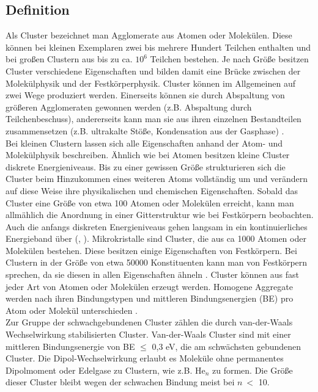 \subsection{Definition}

Als Cluster bezeichnet man Agglomerate aus Atomen oder Molekülen. Diese können bei kleinen Exemplaren zwei bis mehrere Hundert Teilchen enthalten und bei großen Clustern aus bis zu ca. $\mathrm{10^6}$ Teilchen bestehen. Je nach Größe besitzen Cluster verschiedene Eigenschaften und bilden damit eine Brücke zwischen der Molekülphysik und der Festkörperphysik. Cluster können im Allgemeinen auf zwei Wege produziert werden. Einerseits können sie durch Abspaltung von größeren Agglomeraten gewonnen werden (z.B. Abspaltung durch Teilchenbeschuss), andererseits kann man sie aus ihren einzelnen Bestandteilen zusammensetzen (z.B. ultrakalte Stöße, Kondensation aus der Gasphase) \cite{barth2007}. \\
Bei kleinen Clustern lassen sich alle Eigenschaften anhand der Atom- und Molekülphysik beschreiben. Ähnlich wie bei Atomen besitzen kleine Cluster diskrete Energieniveaus.
Bis zu einer gewissen Größe strukturieren sich die Cluster beim Hinzukommen eines weiteren Atoms vollständig um und verändern auf diese Weise ihre physikalischen und chemischen Eigenschaften. Sobald das Cluster eine Größe von etwa 100 Atomen oder Molekülen erreicht, kann man allmählich die Anordnung in einer Gitterstruktur wie bei Festkörpern beobachten. Auch die anfangs diskreten Energieniveaus gehen langsam in ein kontinuierliches Energieband über (\cite{benedek1988}, \cite{General08}).
 Mikrokristalle sind Cluster, die aus ca 1000 Atomen oder Molekülen bestehen. Diese besitzen einige Eigenschaften von Festkörpern. Bei Clustern in der Größe von etwa 50000 Konstituenten kann man von Festkörpern sprechen, da sie diesen in allen Eigenschaften ähneln \cite{General08}. Cluster können aus fast jeder Art von Atomen oder Molekülen erzeugt werden. Homogene Aggregate werden nach ihren Bindungstypen und mittleren Bindungsenergien (BE) pro Atom oder Molekül unterschieden \cite{jortner1984cluster}. \\
 Zur Gruppe der schwachgebundenen Cluster zählen die durch van-der-Waals Wechselwirkung stabilisierten Cluster. Van-der-Waals Cluster sind mit einer mittleren Bindungsenergie von BE $\leq$ 0,3 eV, die am schwächsten gebundenen Cluster. Die Dipol-Wechselwirkung erlaubt es Moleküle ohne permanentes Dipolmoment oder Edelgase zu Clustern, wie z.B. $\mathrm{He}_n$ zu formen. Die Größe dieser Cluster bleibt wegen der schwachen Bindung meist bei $n \ <$ 10. \cite{jortner1984cluster}
 
